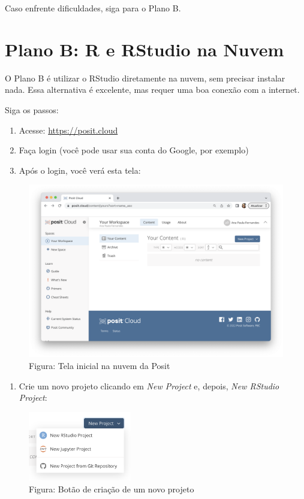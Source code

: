 \documentclass[
]{book}
\providecommand{\tightlist}{%
  \setlength{\itemsep}{0pt}\setlength{\parskip}{0pt}}
\begin{document}
Caso enfrente dificuldades, siga para o Plano B.

\section{Plano B: R e RStudio na Nuvem}\label{plano-b-r-e-rstudio-na-nuvem}

O Plano B é utilizar o RStudio diretamente na nuvem, sem precisar instalar nada. Essa alternativa é excelente, mas requer uma boa conexão com a internet.

Siga os passos:

\begin{enumerate}
\def\labelenumi{\arabic{enumi}.}
\tightlist
\item
  Acesse: \url{https://posit.cloud}
\item
  Faça login (você pode usar sua conta do Google, por exemplo)
\item
  Após o login, você verá esta tela:
\end{enumerate}

\begin{figure}
\centering
\includegraphics{telaPosit.png}
\caption{Figura: Tela inicial na nuvem da Posit}
\end{figure}

\begin{enumerate}
\def\labelenumi{\arabic{enumi}.}
\setcounter{enumi}{3}
\tightlist
\item
  Crie um novo projeto clicando em \emph{New Project} e, depois, \emph{New RStudio Project}:
\end{enumerate}

\begin{figure}
\centering
\includegraphics[width=0.4\textwidth,height=\textheight]{telaCriarProjetoRStudio.png}
\caption{Figura: Botão de criação de um novo projeto}
\end{figure}
\end{document}
